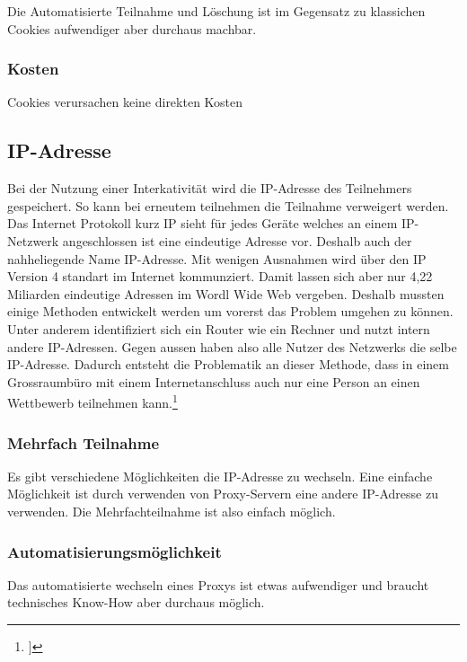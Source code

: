 Die Automatisierte Teilnahme und Löschung ist im Gegensatz zu klassichen
Cookies aufwendiger aber durchaus machbar.

\subsubsection{Kosten}\label{kosten-1}

Cookies verursachen keine direkten Kosten

\subsection{IP-Adresse}\label{ip-adresse}

Bei der Nutzung einer Interkativität wird die IP-Adresse des Teilnehmers
gespeichert. So kann bei erneutem teilnehmen die Teilnahme verweigert
werden. Das Internet Protokoll kurz IP sieht für jedes Geräte welches an
einem IP-Netzwerk angeschlossen ist eine eindeutige Adresse vor. Deshalb
auch der nahheliegende Name IP-Adresse. Mit wenigen Ausnahmen wird über
den IP Version 4 standart im Internet kommunziert. Damit lassen sich
aber nur 4,22 Miliarden eindeutige Adressen im Wordl Wide Web vergeben.
Deshalb mussten einige Methoden entwickelt werden um vorerst das Problem
umgehen zu können. Unter anderem identifiziert sich ein Router wie ein
Rechner und nutzt intern andere IP-Adressen. Gegen aussen haben also
alle Nutzer des Netzwerks die selbe IP-Adresse. Dadurch entsteht die
Problematik an dieser Methode, dass in einem Grossraumbüro mit einem
Internetanschluss auch nur eine Person an einen Wettbewerb teilnehmen
kann.\footnote{\autocite{pclexikon-ip}{]}}

\subsubsection{Mehrfach Teilnahme}\label{mehrfach-teilnahme-1}

Es gibt verschiedene Möglichkeiten die IP-Adresse zu wechseln. Eine
einfache Möglichkeit ist durch verwenden von Proxy-Servern eine andere
IP-Adresse zu verwenden. Die Mehrfachteilnahme ist also einfach möglich.

\subsubsection{Automatisierungsmöglichkeit}\label{automatisierungsmuxf6glichkeit-1}

Das automatisierte wechseln eines Proxys ist etwas aufwendiger und
braucht technisches Know-How aber durchaus möglich.

